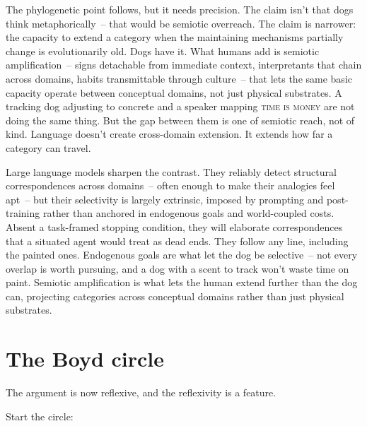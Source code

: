 The phylogenetic point follows, but it needs precision. The claim isn't that dogs think metaphorically~-- that would be semiotic overreach. The claim is narrower: the capacity to extend a category when the maintaining mechanisms partially change is evolutionarily old. Dogs have it. What humans add is semiotic amplification~-- signs detachable from immediate context, interpretants that chain across domains, habits transmittable through culture~-- that lets the same basic capacity operate between conceptual domains, not just physical substrates. A tracking dog adjusting to concrete and a speaker mapping \textsc{time is money} are not doing the same thing. But the gap between them is one of semiotic reach, not of kind. Language doesn't create cross-domain extension. It extends how far a category can travel.

Large language models sharpen the contrast. They reliably detect structural correspondences across domains~-- often enough to make their analogies feel apt~-- but their selectivity is largely extrinsic, imposed by prompting and post-training rather than anchored in endogenous goals and world-coupled costs. Absent a task-framed stopping condition, they will elaborate correspondences that a situated agent would treat as dead ends. They follow any line, including the painted ones. Endogenous goals are what let the dog be selective~-- not every overlap is worth pursuing, and a dog with a scent to track won't waste time on paint. Semiotic amplification is what lets the human extend further than the dog can, projecting categories across conceptual domains rather than just physical substrates.

\section{The Boyd circle}
\label{sec:17:boyd-circle}

The argument is now reflexive, and the reflexivity is a feature.

Start the circle:

